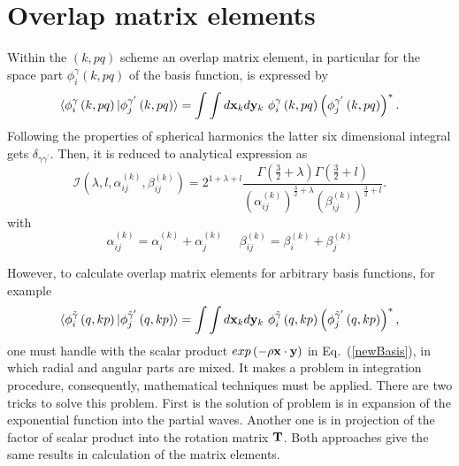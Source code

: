 \documentclass[
12pt, %
oneside, %
english, %
onehalfspacing, %
onehalfspacing, %
headsepline, %
]{MastersDoctoralThesis} %
\begin{document}
\section{Overlap matrix elements}
Within the $\left(k, pq \right)$ scheme an overlap matrix element, in particular for the space part $ \phi_{i}^{\gamma}\left(k, pq \right)$ of the basis function, is expressed by
\begin{equation}
\langle \phi_{i}^{\gamma}\left(k, pq \right) \vert 
\phi_{j}^{\gamma^{\prime}}\left(k, pq \right) \rangle= \int \int d{\bf x}_k d{\bf y}_k ~\phi_{i}^{\gamma}\left(k, pq \right) \left( \phi_{j}^{\gamma^{\prime}}\left(k, pq \right) \right)^{*}.
\end{equation}
Following the properties of spherical harmonics the latter six dimensional integral gets $\delta_{\gamma \gamma^{\prime}}$. Then, it  is reduced to analytical expression as  
\begin{equation}
\mathcal{I} \left( \lambda,l,\alpha_{ij}^{(k)},\beta_{ij}^{(k)} \right)= 2^{1+\lambda+l}\frac{\Gamma \left( \frac{3}{2}+\lambda \right) \Gamma \left( \frac{3}{2}+l \right) }{ \left( \alpha_{ij}^{(k)} \right) ^{\frac{3}{2}+\lambda} \left( \beta_{ij}^{(k)} \right) ^{\frac{3}{2}+l}} .
\label{table_integral_1}
\end{equation}
with 
\begin{equation}
\alpha_{ij}^{(k)}=\alpha_{i}^{(k)}+\alpha_{j}^{(k)}~~~~~~
\beta_{ij}^{(k)}=\beta_{i}^{(k)}+\beta_{j}^{(k)}
\end{equation}


However, to calculate overlap matrix elements for arbitrary basis functions, for example
\begin{equation}
\langle \phi_{i}^{\tilde{\gamma}}\left(q,kp \right) \vert 
\phi_{j}^{\tilde{\gamma}^{\prime}}\left(q,kp \right) \rangle =
\int \int d{\bf x}_k d{\bf y}_k ~\phi_{i}^{\tilde{\gamma}}\left(q,kp \right) \left( \phi_{j}^{\tilde{\gamma}^{\prime}}\left(q,kp \right) \right)^{*},
\label{me_arb}
\end{equation}
one must handle with the scalar product $exp\left(- \rho {\bf x} \cdot {\bf y} \right)$ in  Eq.~(\ref{newBasis}), in which radial and angular parts are mixed. It makes a problem in integration procedure, consequently, mathematical techniques must be applied. There are two tricks to solve this problem.  First is the solution of problem is in expansion of  the exponential function into the partial waves. Another one is in projection of the factor of scalar product into the rotation matrix ${\bf T}$. Both approaches give the same results in calculation of the matrix elements. 
\end{document}
